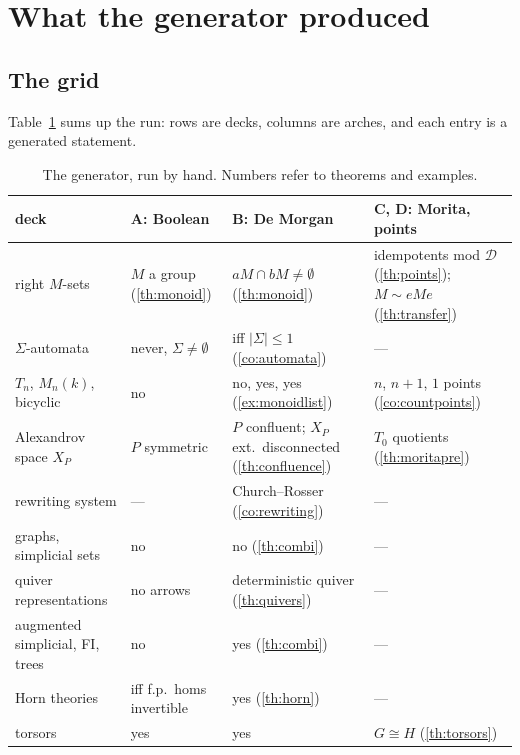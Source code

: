 \section{What the generator produced}\label{sec:conclusion}

\subsection{The grid}

Table~\ref{tab:grid} sums up the run: rows are decks, columns are arches, and each entry is a generated statement.

\begin{table}[ht]\small
\centering
\begin{tabularx}{\linewidth}{>{\raggedright\arraybackslash}p{3.3cm}>{\raggedright\arraybackslash}X>{\raggedright\arraybackslash}X>{\raggedright\arraybackslash}p{3.4cm}}
\toprule
deck & A: Boolean & B: De Morgan & C, D: Morita, points\\
\midrule
right $M$-sets & $M$ a group (\ref{th:monoid}) & $aM\cap bM\neq\emptyset$ (\ref{th:monoid}) & idempotents mod $\mathcal D$ (\ref{th:points}); $M\sim eMe$ (\ref{th:transfer})\\
$\Sigma$-automata & never, $\Sigma\neq\emptyset$ & iff $|\Sigma|\le 1$ (\ref{co:automata}) & ---\\
$T_n$, $M_n(k)$, bicyclic & no & no, yes, yes (\ref{ex:monoidlist}) & $n$, $n+1$, $1$ points (\ref{co:countpoints})\\
Alexandrov space $X_P$ & $P$ symmetric & $P$ confluent; $X_P$ ext.\ disconnected (\ref{th:confluence}) & $T_0$ quotients (\ref{th:moritapre})\\
rewriting system & --- & Church--Rosser (\ref{co:rewriting}) & ---\\
graphs, simplicial sets & no & no (\ref{th:combi}) & ---\\
quiver representations & no arrows & deterministic quiver (\ref{th:quivers}) & ---\\
augmented simplicial, FI, trees & no & yes (\ref{th:combi}) & ---\\
Horn theories & iff f.p.\ homs invertible & yes (\ref{th:horn}) & ---\\
torsors & yes & yes & $G\cong H$ (\ref{th:torsors})\\
\bottomrule
\end{tabularx}
\caption{The generator, run by hand. Numbers refer to theorems and examples.}\label{tab:grid}
\end{table}

